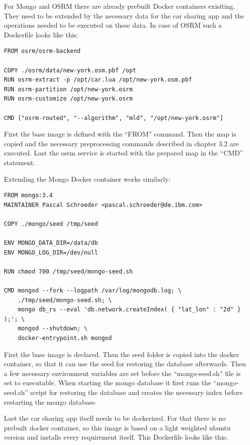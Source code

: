 For Mongo and OSRM there are already prebuilt Docker containers exisiting. They need to be extended by the necessary data for the car sharing app and the operations needed to be executed on these data. In case of OSRM such a Dockerfile looks like this:

\begin{lstlisting}
FROM osrm/osrm-backend

COPY ./osrm/data/new-york.osm.pbf /opt
RUN osrm-extract -p /opt/car.lua /opt/new-york.osm.pbf
RUN osrm-partition /opt/new-york.osrm
RUN osrm-customize /opt/new-york.osrm

CMD ["osrm-routed", "--algorithm", "mld", "/opt/new-york.osrm"]
\end{lstlisting}

First the base image is defined with the ``FROM'' command. Then the map is copied and the necessary preprocessing commands described in chapter 3.2 are executed. Last the osrm service is started with the prepared map in the ``CMD'' statement.

Extending the Mongo Docker container works similarly:

\begin{lstlisting}
FROM mongo:3.4
MAINTAINER Pascal Schroeder <pascal.schroeder@de.ibm.com>

COPY ./mongo/seed /tmp/seed

ENV MONGO_DATA_DIR=/data/db
ENV MONGO_LOG_DIR=/dev/null

RUN chmod 700 /tmp/seed/mongo-seed.sh

CMD mongod --fork --logpath /var/log/mongodb.log; \
    ./tmp/seed/mongo-seed.sh; \
    mongo db_rs --eval 'db.network.createIndex( { "lat_lon" : "2d" } );'; \
    mongod --shutdown; \
    docker-entrypoint.sh mongod
\end{lstlisting}

First the base image is declared. Then the seed folder is copied into the docker container, so that it can use the seed for restoring the database afterwards. Then a few necessary environment variables are set before the ``mongo-seed.sh'' file is set to executable. When starting the mongo database it first runs the ``mongo-seed.sh'' script for restoring the database and creates the necessary index before restarting the mongo database.

Last the car sharing app itself needs to be dockerized. For that there is no prebuilt docker container, so this image is based on a light weighted ubuntu version and installs every requirement itself. This Dockerfile looks like this:

